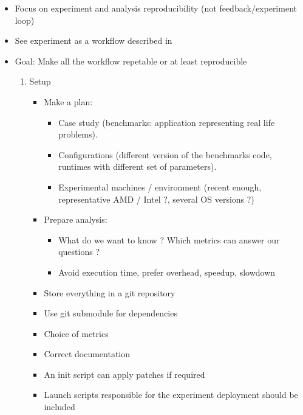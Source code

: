 \begin{itemize}
    \item Focus on experiment and analysis reproducibility (not
        feedback/experiment loop)
    \item See experiment as a workflow described in 
    \item Goal: Make all the workflow repetable or at least reproducible
        \begin{enumerate}
            \item Setup
                \begin{itemize}
                    \item Make a plan:
                        \begin{itemize}
                            \item Case study (benchmarks: application representing real life
                                problems).
                            \item Configurations (different version of the benchmarks code,
                                runtimes with different set of parameters).
                            \item Experimental machines / environment (recent enough,
                                representative AMD / Intel ?, several OS versions ?)
                        \end{itemize}
                    \item Prepare analysis:
                        \begin{itemize}
                            \item What do we want to know ? Which metrics can answer our
                                questions ?
                            \item Avoid execution time, prefer overhead, speedup, slowdown
                        \end{itemize}
                    \item Store everything in a git repository
                    \item Use git submodule for dependencies
                    \item Choice of metrics
                    \item Correct documentation
                    \item An init script can apply patches if required
                    \item Launch scripts responsible for the experiment
                        deployment should be included

\end{itemize}
\end{enumerate}
\end{itemize}

